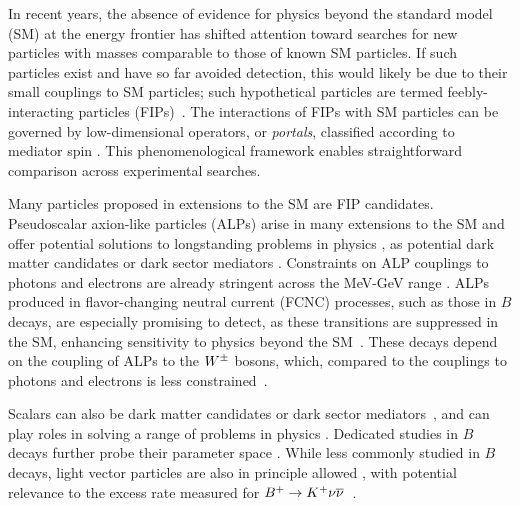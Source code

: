 \maketitle

In recent years, the absence of evidence for physics beyond the standard model (SM) at the energy frontier has shifted attention toward searches for new particles with masses comparable to those of known SM particles. If such particles exist and have so far avoided detection, this would likely be due to their small couplings to SM particles; such hypothetical particles are termed feebly-interacting particles (FIPs)~\cite{Agrawal_2021}. The interactions of FIPs with SM particles can be governed by low-dimensional operators, or \textit{portals}, classified according to mediator spin \cite{Batell:2022hko}. This phenomenological framework enables straightforward comparison across experimental searches.


Many particles proposed in extensions to the SM are FIP candidates. Pseudoscalar axion-like particles (ALPs) arise in many extensions to the SM \cite{PhysRevD.16.1791, PhysRevLett.40.223, PhysRevLett.40.279} and offer potential solutions to longstanding problems in physics \cite{Graham_2015}, as potential dark matter candidates \cite{ABBOTT1983133,DINE1983137,PRESKILL1983127} or dark sector mediators \cite{PhysRevD.79.075008}. Constraints on ALP couplings to photons and electrons are already stringent across the MeV-GeV range \cite{Graham_2015, Essig_2013, Marsh_2016,BaBar:2021ich,Sungjin25}. ALPs produced in flavor-changing neutral current (FCNC) processes, such as those in $B$ decays, are especially promising to detect, as these transitions are suppressed in the SM, enhancing sensitivity to physics beyond the SM~\cite{Bauer:2021mvw, zhang2023belle, NA62_2021,NA62:2020xlg, NA62:2023olg, NA62:2020pwi, BNL-E949:2009dza}. These decays depend on the coupling of ALPs to the $W^\pm$ bosons, which, compared to the couplings to photons and electrons is less constrained~\cite{Izaguirre_2017, PhysRevLett.115.221801, Dolan_2015, Dolan_2015Erratum, PhysRevD.83.115009, PhysRevD.79.075008, PhysRevD.71.014015}.


Scalars can also be dark matter candidates \cite{Silveira:1985rk} or dark sector mediators~\cite{Pospelov:2007mp}, and can play roles in solving a range of problems in physics \cite{Patt:2006fw, OConnell:2006rsp, Piazza:2010ye,PhysRevLett.115.221801,Espinosa:1993bs, Profumo:2007wc, Croon:2019ugf, Bezrukov:2009yw}. Dedicated studies in $B$ decays further probe their parameter space \cite{PhysRevD.101.095006, PhysRevD.93.025026}. While less commonly studied in $B$ decays, light vector particles are also in principle allowed \cite{Datta_2023, Fuyuto_2016}, with potential relevance to the excess rate measured for $B^+\rightarrow K^+\nu\overline{\nu}$~\cite{gabrielli2024}.


